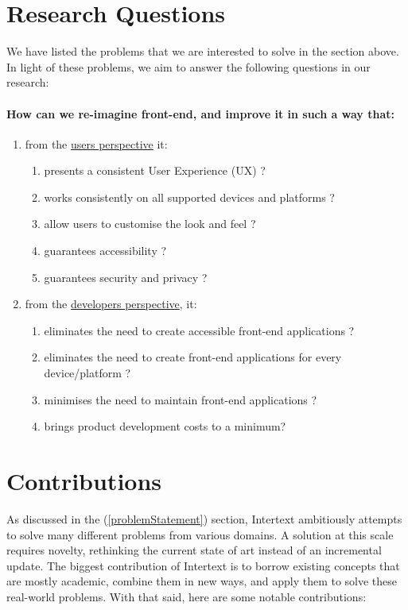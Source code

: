 \section{Research Questions} \label{researchQuestions}

We have listed the problems that we are interested to solve in the section above. In light of these problems, we aim to answer the following questions in our research:

\paragraph{How can we re-imagine front-end, and improve it in such a way that:}
\begin{enumerate}
  \item from the \underline{users perspective} it:
  \begin{enumerate}
    \item presents a consistent User Experience (UX) ?
    \item works consistently on all supported devices and platforms ?
    \item allow users to customise the look and feel ?
    \item guarantees accessibility ?
    \item guarantees security and privacy ?
  \end{enumerate}
  \item from the \underline{developers perspective}, it:
  \begin{enumerate}
    \item eliminates the need to create accessible front-end applications ?
    \item eliminates the need to create front-end applications for every device/platform ?
    \item minimises the need to maintain front-end applications ?
    \item brings product development costs to a minimum?
    
  \end{enumerate}
\end{enumerate}

\section{Contributions} \label{contributions}

As discussed in the  (\ref{problemStatement}) section, Intertext ambitiously attempts to solve many different problems from various domains. A solution at this scale requires novelty, rethinking the current state of art instead of an incremental update. The biggest contribution of Intertext is to borrow existing concepts that are mostly academic, combine them in new ways, and apply them to solve these real-world problems. With that said, here are some notable contributions:

